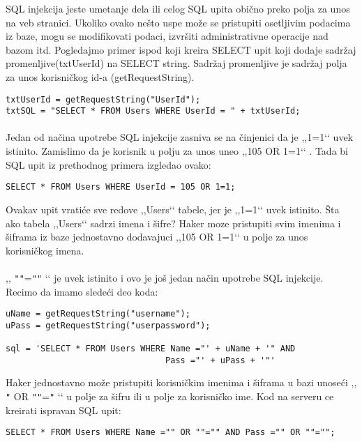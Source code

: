 \documentclass[a4paper]{article}
\begin{document}
SQL injekcija jeste umetanje dela ili celog SQL upita obično preko polja za unos na veb stranici. Ukoliko ovako nešto uspe može se pristupiti osetljivim podacima iz baze, mogu se modifikovati podaci, izvršiti administrativne operacije nad bazom itd. Pogledajmo primer ispod koji kreira SELECT upit koji dodaje sadržaj promenljive(txtUserId) na SELECT string. Sadržaj promenljive je sadržaj polja za unos korisničkog id-a (getRequestString).
\begin{verbatim}
txtUserId = getRequestString("UserId");
txtSQL = "SELECT * FROM Users WHERE UserId = " + txtUserId;
\end{verbatim}

\paragraph{}
Jedan od načina upotrebe SQL injekcije zasniva se na činjenici da je ,,1=1‘‘ uvek istinito. Zamislimo da je korisnik u polju za unos uneo ,,105 OR 1=1‘‘ . Tada bi SQL upit iz prethodnog primera izgledao ovako:

\begin{verbatim}
SELECT * FROM Users WHERE UserId = 105 OR 1=1;
\end{verbatim}


\noindent Ovakav upit vratiće sve redove ,,Users‘‘ tabele, jer je ,,1=1‘‘ uvek istinito. Šta ako tabela ,,Users‘‘ sadrzi imena i šifre? Haker moze pristupiti svim imenima i šiframa iz baze jednostavno dodavajuci ,,105 OR 1=1‘‘ u polje za unos korisničkog imena.

\paragraph{}
 ,, \texttt{"}\texttt{"}=\texttt{"}\texttt{"} ‘‘ je uvek istinito i ovo je još jedan način upotrebe SQL injekcije. Recimo da imamo sledeći deo koda:
\begin{verbatim}
uName = getRequestString("username");
uPass = getRequestString("userpassword");

sql = 'SELECT * FROM Users WHERE Name ="' + uName + '" AND 
								Pass ="' + uPass + '"'
\end{verbatim}

\noindent Haker jednostavno može pristupiti korisničkim imenima i šiframa u bazi unoseći ,, \texttt{"} OR \texttt{"}\texttt{"}=\texttt{"} ‘‘ u polje za šifru ili u polje za korisničko ime. Kod na serveru ce kreirati ispravan SQL upit:

\begin{verbatim}
SELECT * FROM Users WHERE Name ="" OR ""="" AND Pass ="" OR ""="";
\end{verbatim}
\end{document}

